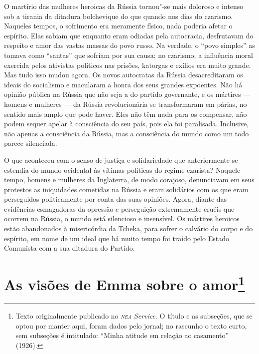 O martírio das mulheres heroicas da Rússia tornou"-se mais doloroso e
intenso sob a tirania da ditadura bolchevique do que quando nos dias do
czarismo. Naqueles tempos, o sofrimento era meramente físico, nada
poderia afetar o espírito. Elas sabiam que enquanto eram odiadas pela
autocracia, desfrutavam do respeito e amor das vastas massas do povo
russo. Na verdade, o ``povo simples'' as tomava como ``santas'' que
sofriam por sua causa; no czarismo, a influência moral exercida pelos
ativistas políticos nas prisões, katorgas e exílios era muito grande.
Mas tudo isso mudou agora. Os novos autocratas da Rússia desacreditaram
os ideais do socialismo e macularam a honra dos seus grandes expoentes.
Não há opinião pública na Rússia que não seja a do partido governante, e
os mártires --- homens e mulheres --- da Rússia revolucionária se
transformaram em párias, no sentido mais amplo que pode haver. Eles não
têm nada para os compensar, não podem sequer apelar à consciência do seu
país, pois ela foi paralisada. Inclusive, não apenas a consciência da
Rússia, mas a consciência do mundo como um todo parece silenciada.

O que aconteceu com o senso de justiça e solidariedade que
anteriormente se estendia do mundo ocidental às vítimas políticas do
regime czarista? Naquele tempo, homens e mulheres da Inglaterra, de modo
corajoso, denunciavam em seus protestos as iniquidades cometidas na
Rússia e eram solidários com os que eram perseguidos politicamente por
conta das suas opiniões. Agora, diante das evidências esmagadoras da
opressão e perseguição extremamente cruéis que ocorrem na Rússia, o
mundo está silencioso e insensível. Os mártires heroicos estão
abandonados à misericórdia da Tcheka, para sofrer o calvário do corpo e
do espírito, em nome de um ideal que há muito tempo foi traído pelo
Estado Comunista com a sua ditadura do Partido.

\chapter{As visões de Emma sobre o amor\footnote[*]{Texto originalmente publicado no
  \emph{\textsc{nea} Service}. O título e as subseções, que se optou por manter
  aqui, foram dados pelo jornal; no rascunho o texto curto, sem
  subseções é intitulado: ``Minha atitude em relação ao casamento'' (1926).}}

